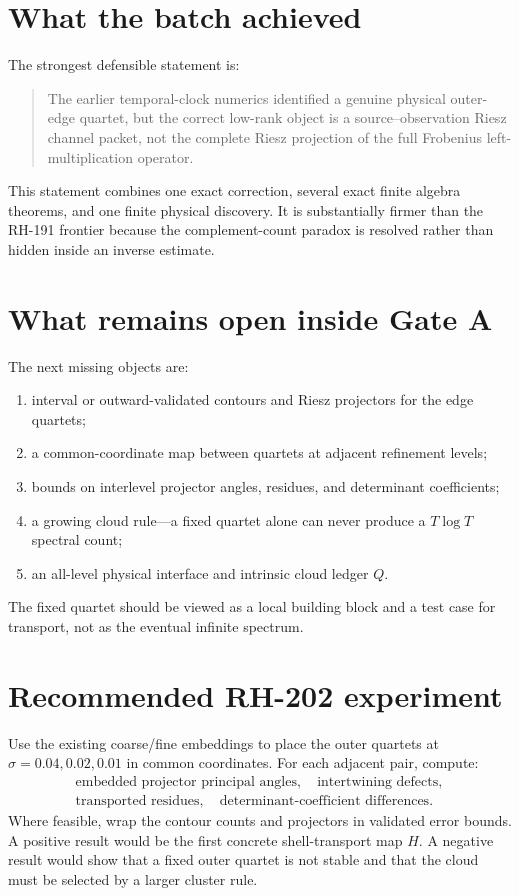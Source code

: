 \documentclass[12pt]{article}
\theoremstyle{remark}
\begin{document}
\section{What the batch achieved}

The strongest defensible statement is:
\begin{quote}
The earlier temporal-clock numerics identified a genuine physical outer-edge
quartet, but the correct low-rank object is a source--observation Riesz
channel packet, not the complete Riesz projection of the full Frobenius
left-multiplication operator.
\end{quote}

This statement combines one exact correction, several exact finite algebra
theorems, and one finite physical discovery.  It is substantially firmer than
the RH-191 frontier because the complement-count paradox is resolved rather
than hidden inside an inverse estimate.

\section{What remains open inside Gate A}

The next missing objects are:
\begin{enumerate}[leftmargin=2em]
\item interval or outward-validated contours and Riesz projectors for the
 edge quartets;
\item a common-coordinate map between quartets at adjacent refinement
 levels;
\item bounds on interlevel projector angles, residues, and determinant
 coefficients;
\item a growing cloud rule---a fixed quartet alone can never produce a
 $T\log T$ spectral count;
\item an all-level physical interface and intrinsic cloud ledger $Q$.
\end{enumerate}

The fixed quartet should be viewed as a local building block and a test case
for transport, not as the eventual infinite spectrum.

\section{Recommended RH-202 experiment}

Use the existing coarse/fine embeddings to place the outer quartets at
$\sigma=0.04,0.02,0.01$ in common coordinates.  For each adjacent pair,
compute:
\begin{equation}\label{eq:transport-data}
 \begin{gathered}
 \text{embedded projector principal angles},\quad
 \text{intertwining defects},\\
 \text{transported residues},\quad
 \text{determinant-coefficient differences}.
 \end{gathered}
\end{equation}
Where feasible, wrap the contour counts and projectors in validated error
bounds.  A positive result would be the first concrete shell-transport map
$H$.  A negative result would show that a fixed outer quartet is not stable
and that the cloud must be selected by a larger cluster rule.
\end{document}
